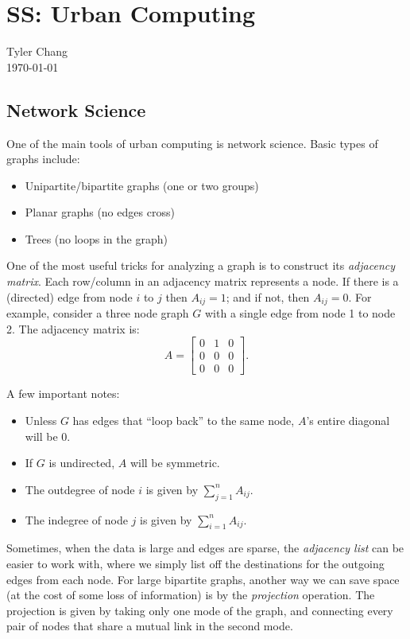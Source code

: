 \documentclass[12pt]{article}
\begin{document}
\section*{SS: Urban Computing}
Tyler Chang\\
\today

\subsection*{Network Science}

One of the main tools of urban computing is network science.
Basic types of graphs include:
\begin{itemize}
\item Unipartite/bipartite graphs (one or two groups)
\item Planar graphs (no edges cross)
\item Trees (no loops in the graph)
\end{itemize}
One of the most useful tricks for analyzing a graph is to construct its
{\it adjacency matrix}.
Each row/column in an adjacency matrix represents a node.
If there is a (directed) edge from node $i$ to $j$ then $A_{ij} = 1$;
and if not, then $A_{ij} = 0$.
For example, consider a three node graph $G$ with a single edge from node 1 to
node 2.
The adjacency matrix is:
$$
A = \left[ \begin{array}{ccc}
0 & 1 & 0\\ 0 & 0 & 0 \\ 0 & 0 & 0
\end{array} \right].
$$

A few important notes:
\begin{itemize}
\item Unless $G$ has edges that ``loop back'' to the same node, $A$'s entire
diagonal will be $0$.
\item If $G$ is undirected, $A$ will be symmetric.
\item The outdegree of node $i$ is given by $\sum_{j=1}^n A_{ij}$.
\item The indegree of node $j$ is given by $\sum_{i=1}^n A_{ij}$.
\end{itemize}

Sometimes, when the data is large and edges are sparse, the {\it adjacency list}
can be easier to work with, where we simply list off the destinations for the 
outgoing edges from each node.
For large bipartite graphs, another way we can save space (at the cost of
some loss of information) is by the {\it projection} operation.
The projection is given by taking only one mode of the graph, and connecting
every pair of nodes that share a mutual link in the second mode.
\end{document}
